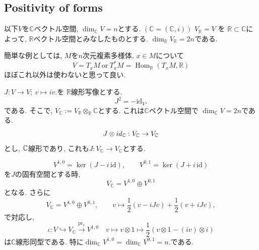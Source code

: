 \subsection{Positivity of forms}
以下\(V\)を\(\mathbb{C}\)ベクトル空間,
 \(\dim_{\mathbb{C}}V=n\)とする. \((\mathbb{C}=(\mathbb{C},i))\)
\(V_{\mathbb{R}}=V\) を \(\mathbb{R}\subset \mathbb{C}\)によって,  \(\mathbb{R}\)ベクトル空間とみなしたものとする. \(\dim_{\mathbb{R}}V_{\mathbb{R}}=2n\)である. 

\begin{tcolorbox}[mybox]
簡単な例としては, $M$を$n$次元複素多様体, $x \in M$について
\[
V=T_{x}M \ \text{or}\ T_{x}^{*}M=\operatorname{Hom}_{\mathbb{R}}(T_{x}M,\mathbb{R})
\]
ほぼこれ以外は使わないと思って良い. 
\end{tcolorbox}
 \(J:V\to V;\ v\mapsto iv.\)を \(\mathbb{R}\text{線形写像}\)とする. 
\[
 J^{2}=-\mathrm{id}_{V}.
\]
である. 
そこで, \(V_{\mathbb{C}}:=V_{\mathbb{R}}\otimes_{\mathbb{R}}\mathbb{C}\)とする. 
これは\(\mathbb{C}\)ベクトル空間で \(\dim_{\mathbb{C}}V=2n\)である. 
 \[
J \otimes id_{\mathbb{C}}:V_{\mathbb{C}}\to V_{\mathbb{C}}
\]
とし, $\mathbb{C}$線形であり, これも$J : V_{\mathbb{C}}\to V_{\mathbb{C}}$とする. 


\begin{tcolorbox}[mybox]
\begin{lem}
\label{lem-M-4.3.3}
\[
V^{1,0}=\ker(J-i\,\mathrm{id}),\qquad V^{0,1}=\ker(J+i\,\mathrm{id})
\]
を\(J\)の固有空間とする時, 
\[
V_{\mathbb{C}}=V^{1,0}\oplus V^{0,1}
\]
となる. 
さらに
\[
V_{\mathbb{C}}=V^{1,0}\oplus V^{0,1},
\qquad
v\mapsto \frac{1}{2}(v-iJv)+\frac{1}{2}(v+iJv),
\]
で対応し, 
\[
\iota: V \hookrightarrow  V_{\mathbb{C}}\xrightarrow{\mathrm{pr}_{1}}V^{1,0}
\quad 
v\mapsto v\otimes 1\mapsto \frac{1}{2}(v\otimes 1-(iv)\otimes i)
\]
は\(\mathbb{C}\)線形同型である. 
特に\(\dim_{\mathbb{C}}V^{1,0}=\dim_{\mathbb{C}}V^{0,1}=n.\)である. 
\end{lem}
\end{tcolorbox}

